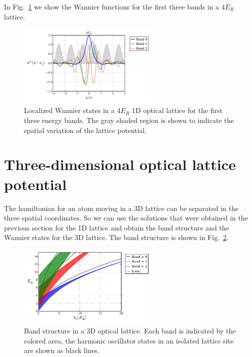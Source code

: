 \documentclass[oneside,11pt]{memoir}
\begin{document}
In Fig.~\ref{fig:wannier1d_bands} we show the Wannier functions for the first
three bands in a 4$E_{R}$ lattice.  
\begin{figure}
\centering \includegraphics[width=0.6\textwidth]{../figures/BandStructure_figures/wannier1d_bands.pdf}
\caption[Wannier states in 1D lattice for the first three energy bands.]{\small
Localized Wannier states in a 4$E_{R}$ 1D optical lattice for the first three
energy bands.
The gray shaded region is shown to  indicate the spatial variation of the
lattice potential.
} \label{fig:wannier1d_bands}
\end{figure}

\section{Three-dimensional optical lattice potential}

The hamiltonian for an atom moving in a  3D lattice can be separated in the
three spatial coordinates.  So we can use the solutions that were obtained in
the previous section for the 1D lattice and obtain the band structure and the
Wannier states for the 3D lattice.   
The band structure is shown in Fig.~\ref{fig:bands3d_V0}. 
\begin{figure}
\centering \includegraphics[width=0.6\textwidth]{../figures/BandStructure_figures/bands3d_V0.pdf}
\caption[Band structure in 3D lattice.]{\small Band structure in a 3D optical
lattice.  Each band is indicated by the colored area,  the harmonic oscillator
states in an isolated lattice site are shown as black lines. }
\label{fig:bands3d_V0}
\end{figure}
\end{document}

